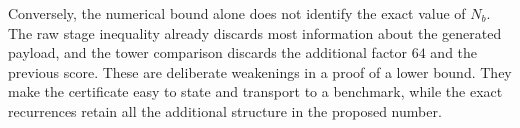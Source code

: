 Conversely, the numerical bound alone does not identify the exact value of
$N_b$.  The raw stage inequality already discards most information about
the generated payload, and the tower comparison discards the additional
factor $64$ and the previous score.  These are deliberate weakenings in a
proof of a lower bound.  They make the certificate easy to state and
transport to a benchmark, while the exact recurrences retain all the
additional structure in the proposed number.
